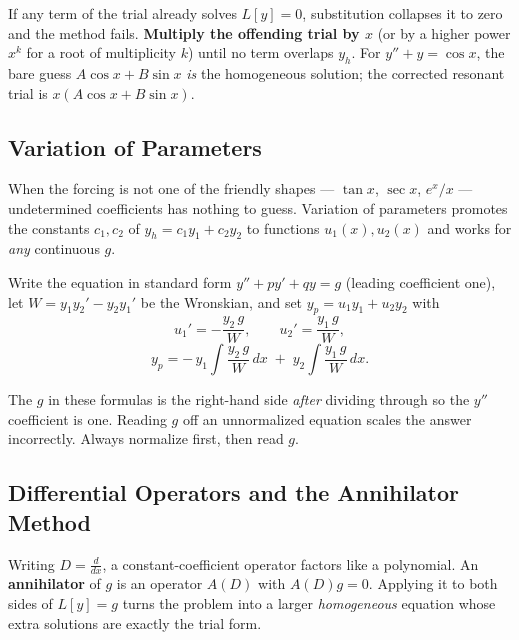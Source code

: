 \begin{warningbox}
If any term of the trial already solves $L[y]=0$, substitution collapses it to
zero and the method fails. \textbf{Multiply the offending trial by $x$} (or by a
higher power $x^k$ for a root of multiplicity $k$) until no term overlaps $y_h$.
For $y''+y=\cos x$, the bare guess $A\cos x + B\sin x$ \emph{is} the homogeneous
solution; the corrected resonant trial is $x(A\cos x + B\sin x)$.
\end{warningbox}

\subsection{Variation of Parameters}

When the forcing is not one of the friendly shapes --- $\tan x$, $\sec x$,
$e^x/x$ --- undetermined coefficients has nothing to guess. Variation of
parameters promotes the constants $c_1,c_2$ of $y_h = c_1 y_1 + c_2 y_2$ to
functions $u_1(x),u_2(x)$ and works for \emph{any} continuous $g$.

\begin{formulabox}
Write the equation in standard form $y'' + p y' + q y = g$ (leading coefficient
one), let $W = y_1 y_2' - y_2 y_1'$ be the Wronskian, and set $y_p = u_1 y_1 + u_2 y_2$ with
\[ u_1' = -\frac{y_2\, g}{W}, \qquad u_2' = \frac{y_1\, g}{W}, \]
\[ y_p = -\,y_1\!\int \frac{y_2\, g}{W}\,dx \;+\; y_2\!\int \frac{y_1\, g}{W}\,dx. \]
\end{formulabox}

\begin{warningbox}
The $g$ in these formulas is the right-hand side \emph{after} dividing through so
the $y''$ coefficient is one. Reading $g$ off an unnormalized equation scales the
answer incorrectly. Always normalize first, then read $g$.
\end{warningbox}

\subsection{Differential Operators and the Annihilator Method}

Writing $D = \tfrac{d}{dx}$, a constant-coefficient operator factors like a
polynomial. An \textbf{annihilator} of $g$ is an operator $A(D)$ with $A(D)g = 0$.
Applying it to both sides of $L[y]=g$ turns the problem into a larger
\emph{homogeneous} equation whose extra solutions are exactly the trial form.

